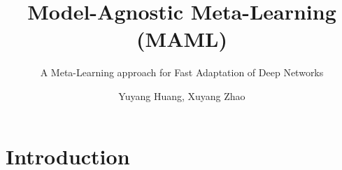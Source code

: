 \documentclass[9pt]{beamer}
\begin{document}
	
	
    \title{Model-Agnostic Meta-Learning (MAML) }
    \subtitle{A Meta-Learning approach for Fast Adaptation of Deep Networks}
    \author{Yuyang Huang, Xuyang Zhao}
    \date{\hspace{2em}}
    \frame{
    \titlepage
    }


\section{Introduction}
\end{document}

